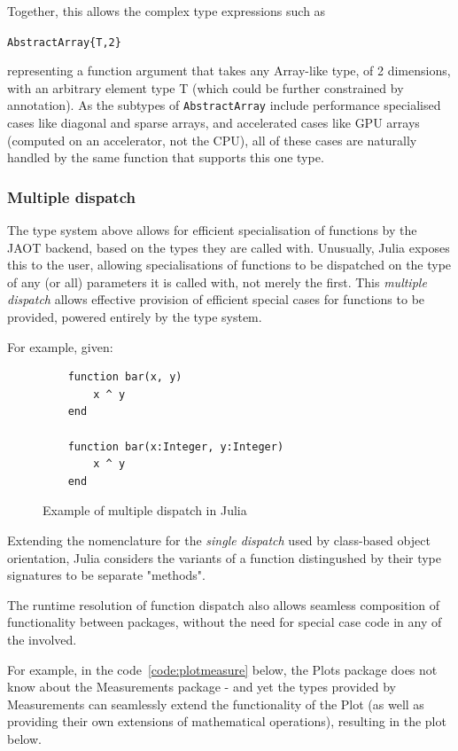 \documentclass{webofc}
\begin{document}
Together, this allows the complex type expressions such as

\verb$AbstractArray{T,2}$ 

representing a function argument that takes any Array-like type, of 2 dimensions,
with an arbitrary element type T (which could be further constrained by annotation).
As the subtypes of \verb$AbstractArray$ include performance specialised cases like
diagonal and sparse arrays, and accelerated cases like GPU arrays (computed on
an accelerator, not the CPU), all of these cases are naturally handled by the same
function that supports this one type. 

\subsubsection{Multiple dispatch}

The type system above allows for efficient specialisation of functions by the JAOT
 backend, based on the types they are called with.
Unusually, Julia exposes this to the user, allowing specialisations of functions
 to be dispatched on the type of any (or all) parameters it is called with, not
 merely the first. This \textit{multiple dispatch} allows effective provision of 
 efficient special cases for functions to be provided, powered entirely by the type
 system.

For example, given:

\begin{figure}[!ht]
    \centering
    \begin{verbatim}
    function bar(x, y) 
        x ^ y
    end

    function bar(x:Integer, y:Integer)
        x ^ y 
    end
    \end{verbatim}
    \caption{Example of multiple dispatch in Julia}
    \label{code:multipledis}
    \end{figure}

Extending the nomenclature for the \textit{single dispatch} used by
class-based object orientation, Julia considers the variants of a function
distingushed by their type signatures to be separate "methods". 

The runtime resolution of function dispatch also allows seamless composition
of functionality between packages, without the need for special case 
code in any of the involved.

For example, in the code~\ref{code:plotmeasure} below, the Plots package does
 not know about the Measurements package - and yet the types provided by 
 Measurements can seamlessly extend the functionality of the Plot (as well as
 providing their own extensions of mathematical operations), resulting in the 
 plot below.
\end{document}
